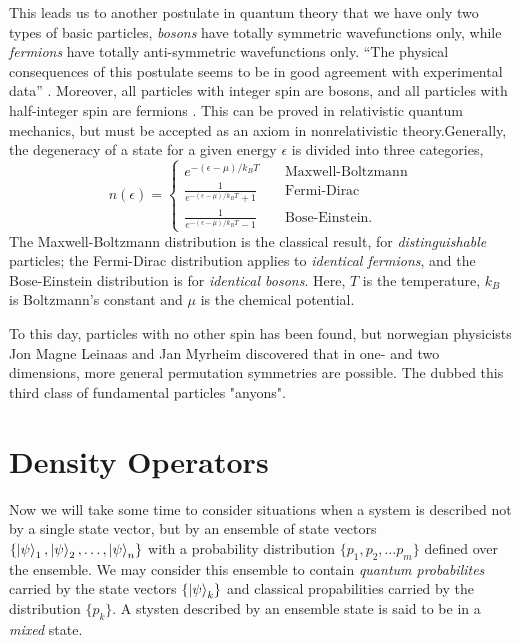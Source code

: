    This leads us to another postulate in quantum theory that we have only two types of 
    basic particles, \emph{bosons} have totally symmetric wavefunctions only, while 
    \emph{fermions} have totally anti-symmetric wavefunctions only. ``The physical 
    consequences of this postulate seems to be in good agreement with experimental data''
    \cite{leinaas1977theory}. Moreover, all particles with integer spin are bosons, 
    and all particles with half-integer spin are fermions
    \cite{fierz1939relativistische,pauli1940connection}. This can be proved in relativistic
    quantum mechanics, but must be accepted as an axiom in nonrelativistic 
    theory\cite{hilborn1995atoms}.Generally, the degeneracy of a state for a given 
    energy $\epsilon$ is divided into three categories,
    \begin{equation}
        n(\epsilon) = \begin{cases}
            e^{-(\epsilon - \mu)/k_BT} &\quad \text{Maxwell-Boltzmann} \\
            \frac{1}{e^{-(\epsilon - \mu)/k_BT} + 1} &\quad \text{Fermi-Dirac} \\
            \frac{1}{e^{-(\epsilon - \mu)/k_BT} - 1} &\quad \text{Bose-Einstein}.
        \end{cases}
    \end{equation}
    The Maxwell-Boltzmann distribution is the classical result, for \emph{distinguishable}
    particles; the Fermi-Dirac distribution applies to \emph{identical fermions}, and 
    the Bose-Einstein distribution is for \emph{identical bosons}. Here, $T$ is the 
    temperature, $k_B$ is Boltzmann's constant and $\mu$ is the chemical potential.

    To this day, particles with no other spin has been found, but norwegian physicists
    Jon Magne Leinaas and Jan Myrheim discovered that in one- and two dimensions, more 
    general permutation symmetries are possible. The dubbed this third class of
    fundamental particles "anyons"\cite{leinaas1977theory}.

\section{Density Operators}

    Now we will take some time to consider situations when a system is described not by 
    a single state vector, but by an ensemble of state vectors
    $\{\ket{\psi}_1, \ket{\psi}_2, \dots ,\ket{\psi}_n\}$ with a probability distribution 
    $\{p_1,p_2,\dots p_m \}$ defined over the ensemble. We may consider this ensemble to contain
    \emph{quantum probabilites} carried by the state vectors $\{\ket{\psi}_k \}$ and classical 
    propabilities carried by the distribution $\{p_k\}$. A stysten described by an ensemble 
    state is said to be in a \emph{mixed} state.

